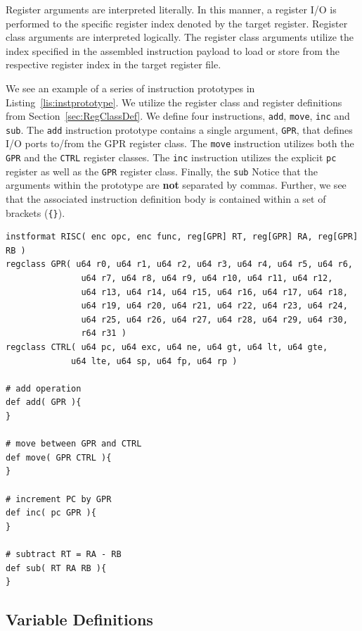 \documentclass{article}
\begin{document}
Register arguments are interpreted literally.  In this manner, a register I/O is performed to the specific 
register index denoted by the target register.  Register class arguments are interpreted logically.  The register 
class arguments utilize the index specified in the assembled instruction payload to load or store from the respective 
register index in the target register file.  

We see an example of a series of instruction prototypes in Listing~\ref{lis:instprototype}.  We utilize the register class 
and register definitions from Section~\ref{sec:RegClassDef}.  We define four instructions, \texttt{add}, \texttt{move}, 
\texttt{inc} and \texttt{sub}.  The \texttt{add} instruction prototype contains a single argument, \texttt{GPR}, that defines I/O ports 
to/from the GPR register class.  The \texttt{move} instruction utilizes both the \texttt{GPR} and the \texttt{CTRL} 
register classes.  The \texttt{inc} instruction utilizes the explicit \texttt{pc} register as well as the \texttt{GPR} 
register class.  Finally, the \texttt{sub} Notice that the arguments within the prototype are \textbf{not} separated by commas.  Further, we see 
that the associated instruction definition body is contained within a set of brackets (\texttt{\{\}}).  

\clearpage
\vspace{0.125in}
\begin{lstlisting}[frame=single,style=base,caption={Instruction Prototype Format},captionpos=b,label={lis:instprototype}]
instformat RISC( enc opc, enc func, reg[GPR] RT, reg[GPR] RA, reg[GPR] RB )
regclass GPR( u64 r0, u64 r1, u64 r2, u64 r3, u64 r4, u64 r5, u64 r6, 
		       u64 r7, u64 r8, u64 r9, u64 r10, u64 r11, u64 r12, 
		       u64 r13, u64 r14, u64 r15, u64 r16, u64 r17, u64 r18,
		       u64 r19, u64 r20, u64 r21, u64 r22, u64 r23, u64 r24, 
		       u64 r25, u64 r26, u64 r27, u64 r28, u64 r29, u64 r30,
		       r64 r31 )
regclass CTRL( u64 pc, u64 exc, u64 ne, u64 gt, u64 lt, u64 gte,
			 u64 lte, u64 sp, u64 fp, u64 rp )

# add operation			 
def add( GPR ){
}

# move between GPR and CTRL 
def move( GPR CTRL ){
}

# increment PC by GPR
def inc( pc GPR ){
}

# subtract RT = RA - RB
def sub( RT RA RB ){
}
\end{lstlisting}

\clearpage
\subsection{Variable Definitions}
\label{sec:Variable Definitions}
\end{document}
